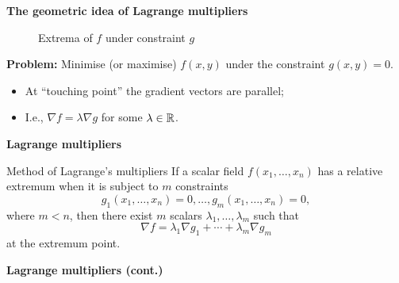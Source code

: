 \textbf{The geometric idea of Lagrange multipliers}


\begin{figure}
    \noindent{}
    \caption{Extrema of \(f\) under constraint \(g\)}
\end{figure}



\textbf{Problem:}
Minimise (or maximise) \(f(x,y)\) under the constraint \(g(x,y) = 0\).
\begin{itemize}
    \item At ``touching point'' the gradient vectors are parallel;
    \item I.e., \(\nabla f = \lambda \nabla g\) for some \(\lambda \in \mathbb{R}\).
\end{itemize}










\textbf{Lagrange multipliers}

{Method of Lagrange's multipliers}
If a scalar field \(f(x_1,\ldots,x_n)\) has a relative extremum when it is subject to \(m\) constraints
\[
    g_1(x_1,\ldots,x_n) = 0,
    \dots , g_m(x_1,\ldots,x_n)=0,
\]
where \(m<n\), then there exist \(m\) scalars \(\lambda_1,\ldots,\lambda_m\) such that
\[
    \nabla f = \lambda_1 \nabla g_1 + \cdots + \lambda_m \nabla g_m
\]
at the extremum point.










\textbf{Lagrange multipliers (cont.)}

